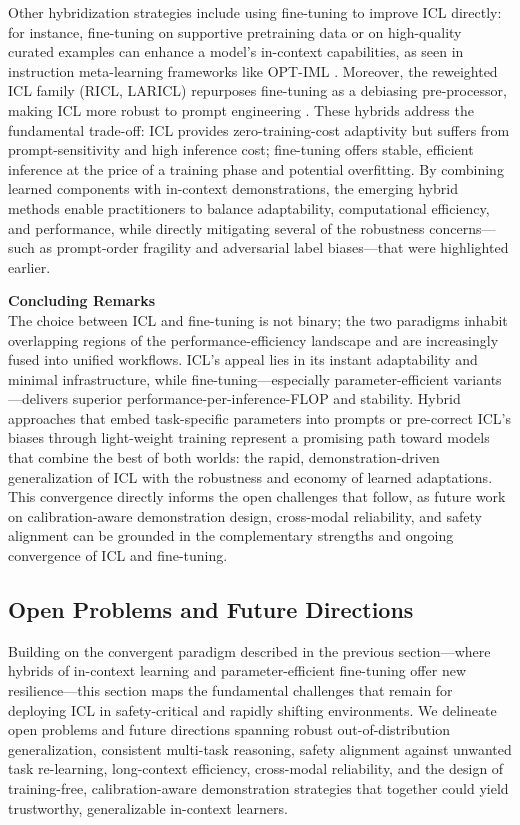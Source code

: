 \documentclass[11pt]{article}
\begin{document}
Other hybridization strategies include using fine-tuning to improve ICL directly: for instance, fine-tuning on supportive pretraining data or on high-quality curated examples can enhance a model's in-context capabilities, as seen in instruction meta-learning frameworks like OPT-IML \cite{ref110}. Moreover, the reweighted ICL family (RICL, LARICL) repurposes fine-tuning as a debiasing pre-processor, making ICL more robust to prompt engineering \cite{ref80}. These hybrids address the fundamental trade-off: ICL provides zero-training-cost adaptivity but suffers from prompt-sensitivity and high inference cost; fine-tuning offers stable, efficient inference at the price of a training phase and potential overfitting. By combining learned components with in-context demonstrations, the emerging hybrid methods enable practitioners to balance adaptability, computational efficiency, and performance, while directly mitigating several of the robustness concerns---such as prompt-order fragility and adversarial label biases---that were highlighted earlier.

\textbf{Concluding Remarks}\\
The choice between ICL and fine-tuning is not binary; the two paradigms inhabit overlapping regions of the performance-efficiency landscape and are increasingly fused into unified workflows. ICL's appeal lies in its instant adaptability and minimal infrastructure, while fine-tuning---especially parameter-efficient variants---delivers superior performance-per-inference-FLOP and stability. Hybrid approaches that embed task-specific parameters into prompts or pre-correct ICL's biases through light-weight training represent a promising path toward models that combine the best of both worlds: the rapid, demonstration-driven generalization of ICL with the robustness and economy of learned adaptations. This convergence directly informs the open challenges that follow, as future work on calibration-aware demonstration design, cross-modal reliability, and safety alignment can be grounded in the complementary strengths and ongoing convergence of ICL and fine-tuning.

\subsection{Open Problems and Future Directions}

Building on the convergent paradigm described in the previous section---where hybrids of in-context learning and parameter-efficient fine-tuning offer new resilience---this section maps the fundamental challenges that remain for deploying ICL in safety-critical and rapidly shifting environments. We delineate open problems and future directions spanning robust out-of-distribution generalization, consistent multi-task reasoning, safety alignment against unwanted task re-learning, long-context efficiency, cross-modal reliability, and the design of training-free, calibration-aware demonstration strategies that together could yield trustworthy, generalizable in-context learners.
\end{document}
